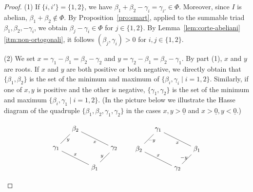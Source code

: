 \documentclass[10pt]{amsart}
\theoremstyle{definition}
\theoremstyle{remark}
\newcommand\ssty{\scriptstyle}
\newcommand\nullvec{\underline 0}
\newcommand\be{\beta}
\newcommand\ga{\gamma}
\begin{document}
\begin{proof}
(1) 
If $\{i,i'\}=\{1, 2\}$, we have $\be_1+\be_2-\ga_i=\ga_{i'}\in \Phi$. 
Moreover, since $I$ is abelian, $\be_1+\be_2\not\in \Phi$.  
By Proposition~\ref{pro:smart}, applied to the summable triad $\be_1, \be_2, -\ga_i$,  we obtain $\be_j-\ga_i\in \Phi$ for $j\in\{1, 2\}$.
By Lemma~\ref{lem:corte-abeliani}\ref{itm:non-ortogonali}, it follows $(\be_j, \ga_i)> 0$ for $i,j\in \{1, 2\}$.
\par

(2) We set $x=\ga_1-\be_1=\be_2-\ga_2$ and $y=\ga_2-\be_1=\be_2-\ga_1$. 
By part (1),  $x$ and $y$ are roots. 
If $x$ and $y$ are  both positive or both negative, we directly obtain that  $\{\be_1, \be_2\}$ is the set of  the minimum and maximum  of $\{\be_i,\ga_i\mid i=1,2\}$.
Similarly, if one of $x, y$ is positive and the other is negative,  $\{\ga_1, \ga_2\}$ is the set of  the minimum and maximum $\{\be_i,\ga_1\mid i=1,2\}$. 
(In the picture below we illustrate the Hasse diagram of the quadruple $\{\be_1, \be_2, \ga_1, \ga_2\}$ in the cases $x, y> \nullvec$ and $x> \nullvec, y< \nullvec$.) 

$$
\begin{tikzpicture}[scale=1]
\draw
(0, 0) node(be2) {$\be_2$} 
(2,-1) node(ga2) {$\ga_2$}
(-1,-1) node(ga1){$\ga_1$}
(1,-2) node(be1) {$\be_1$}
(be2)
--node[pos=0.5, below]{$\ssty x$}
(ga2)
--node[pos=0.8, above]{$\ssty y$} 
(be1)
--node[pos=0.5, above]{$\ssty x$}
(ga1)
--node[pos=0.8, below]{$\ssty y$}
(be2);
\end{tikzpicture}
\qquad
\begin{tikzpicture}[scale=1]
\draw
(0, 0) node(ga1) {$\ga_1$} 
(2,-1) node(be1) {$\be_1$}
(-1,-1) node(be2){$\be_2$}
(1,-2) node(ga2) {$\ga_2$}
(be2)
--node[pos=0.5, above]{$\ssty x$}
(ga2)
--node[pos=0.2, above]{$\ssty -y$} 
(be1)
--node[pos=0.5, below]{$\ssty x$}
(ga1)
--node[pos=0.2, below]{$\ssty -y$}
(be2);
\end{tikzpicture}
$$


\end{proof}
\end{document}
